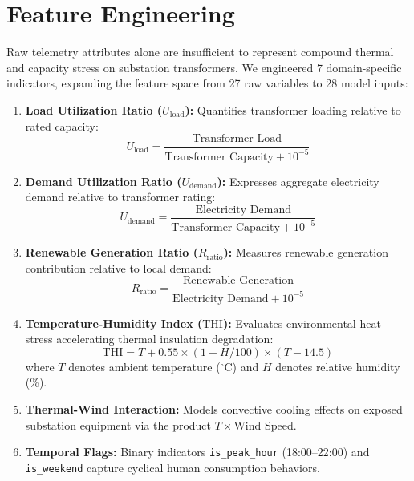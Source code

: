 \section{Feature Engineering}
Raw telemetry attributes alone are insufficient to represent compound thermal and capacity stress on substation transformers. We engineered 7 domain-specific indicators, expanding the feature space from 27 raw variables to 28 model inputs:

\begin{enumerate}
    \item \textbf{Load Utilization Ratio ($U_{\text{load}}$):} Quantifies transformer loading relative to rated capacity:
    \begin{equation}
    U_{\text{load}} = \frac{\text{Transformer Load}}{\text{Transformer Capacity} + 10^{-5}}
    \end{equation}
    \item \textbf{Demand Utilization Ratio ($U_{\text{demand}}$):} Expresses aggregate electricity demand relative to transformer rating:
    \begin{equation}
    U_{\text{demand}} = \frac{\text{Electricity Demand}}{\text{Transformer Capacity} + 10^{-5}}
    \end{equation}
    \item \textbf{Renewable Generation Ratio ($R_{\text{ratio}}$):} Measures renewable generation contribution relative to local demand:
    \begin{equation}
    R_{\text{ratio}} = \frac{\text{Renewable Generation}}{\text{Electricity Demand} + 10^{-5}}
    \end{equation}
    \item \textbf{Temperature-Humidity Index ($\text{THI}$):} Evaluates environmental heat stress accelerating thermal insulation degradation:
    \begin{equation}
    \text{THI} = T + 0.55 \times (1 - H/100) \times (T - 14.5)
    \end{equation}
    where $T$ denotes ambient temperature ($^{\circ}\text{C}$) and $H$ denotes relative humidity (\%).
    \item \textbf{Thermal-Wind Interaction:} Models convective cooling effects on exposed substation equipment via the product $T \times \text{Wind Speed}$.
    \item \textbf{Temporal Flags:} Binary indicators \texttt{is\_peak\_hour} (18:00--22:00) and \texttt{is\_weekend} capture cyclical human consumption behaviors.
\end{enumerate}

